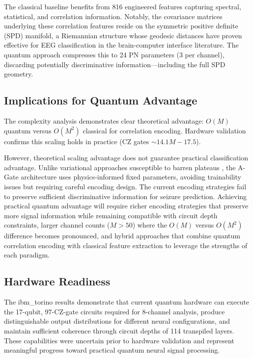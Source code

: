 \documentclass[pdflatex,sn-mathphys-num]{sn-jnl}
\begin{document}
The classical baseline benefits from 816 engineered features capturing spectral, statistical, and correlation information. Notably, the covariance matrices underlying these correlation features reside on the symmetric positive definite (SPD) manifold, a Riemannian structure whose geodesic distances have proven effective for EEG classification in the brain-computer interface literature. The quantum approach compresses this to 24 PN parameters (3 per channel), discarding potentially discriminative information---including the full SPD geometry.

\subsection{Implications for Quantum Advantage}
\label{sec:implications}

The complexity analysis demonstrates clear theoretical advantage: $O(M)$ quantum versus $O(M^2)$ classical for correlation encoding. Hardware validation confirms this scaling holds in practice (CZ gates $\sim 14.1M - 17.5$).

However, theoretical scaling advantage does not guarantee practical classification advantage. Unlike variational approaches susceptible to barren plateaus \cite{mcclean2018}, the A-Gate architecture uses physics-informed fixed parameters, avoiding trainability issues but requiring careful encoding design. The current encoding strategies fail to preserve sufficient discriminative information for seizure prediction. Achieving practical quantum advantage will require richer encoding strategies that preserve more signal information while remaining compatible with circuit depth constraints, larger channel counts ($M > 50$) where the $O(M)$ versus $O(M^2)$ difference becomes pronounced, and hybrid approaches that combine quantum correlation encoding with classical feature extraction to leverage the strengths of each paradigm.

\subsection{Hardware Readiness}
\label{sec:readiness}

The ibm\_torino results demonstrate that current quantum hardware can execute the 17-qubit, 97-CZ-gate circuits required for 8-channel analysis, produce distinguishable output distributions for different neural configurations, and maintain sufficient coherence through circuit depths of 114 transpiled layers. These capabilities were uncertain prior to hardware validation and represent meaningful progress toward practical quantum neural signal processing.
\end{document}
